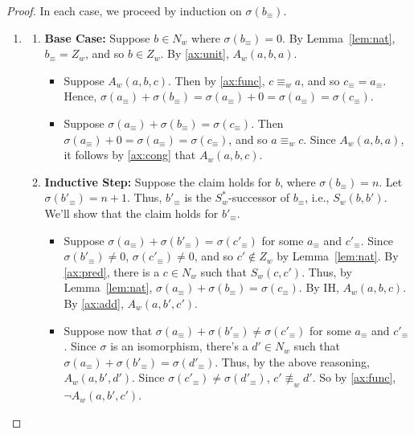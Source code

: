 \documentclass[12pt]{article}
\begin{document}
\begin{proof}
    In each case, we proceed by induction on $\sigma(b_\equiv)$.
    \begin{enumerate}
        \item 
        \begin{enumerate}[label=(\roman*)]
            \item \textbf{Base Case:} Suppose $b \in N_w$ where $\sigma(b_\equiv) = 0$. 
            By Lemma~\ref{lem:nat}, $b_\equiv = Z_w$, and so $b \in Z_w$. 
            By \ref{ax:unit}, $A_w(a,b,a)$. 
            \begin{itemize}
                \item[($\Rightarrow$)] Suppose $A_w(a,b,c)$. 
                Then by \ref{ax:func}, $c \equiv_w a$, and so $c_\equiv = a_\equiv$. 
                Hence, $\sigma(a_\equiv) + \sigma(b_\equiv) = \sigma(a_\equiv) + 0 = \sigma(a_\equiv) = \sigma(c_\equiv)$. 
                
                \item[($\Leftarrow$)] Suppose $\sigma(a_\equiv) + \sigma(b_\equiv) = \sigma(c_\equiv)$. 
                Then $\sigma(a_\equiv) + 0 = \sigma(a_\equiv) = \sigma(c_\equiv)$, and so $a \equiv_w c$. 
                Since $A_w(a,b,a)$, it follows by \ref{ax:cong} that $A_w(a,b,c)$. 
            \end{itemize}

            \item \textbf{Inductive Step:} Suppose the claim holds for $b$, where $\sigma(b_\equiv) = n$. 
            Let $\sigma(b'_\equiv) = n+1$. 
            Thus, $b'_\equiv$ is the $S_w^*$-successor of $b_\equiv$, i.e., $S_w(b,b')$. 
            We'll show that the claim holds for $b'_\equiv$. 
            \begin{itemize}
                \item[($\Leftarrow$)] Suppose $\sigma(a_\equiv) + \sigma(b'_\equiv) = \sigma(c'_\equiv)$ for some $a_\equiv$ and $c'_\equiv$. 
                Since $\sigma(b'_\equiv) \neq 0$, $\sigma(c'_\equiv) \neq 0$, and so $c' \notin Z_w$ by Lemma~\ref{lem:nat}. 
                By \ref{ax:pred}, there is a $c \in N_w$ such that $S_w(c,c')$. 
                Thus, by Lemma~\ref{lem:nat}, $\sigma(a_\equiv) + \sigma(b_\equiv) = \sigma(c_\equiv)$. 
                By IH, $A_w(a,b,c)$. 
                By \ref{ax:add}, $A_w(a,b',c')$. 
                
                \item[($\Rightarrow)$] Suppose now that $\sigma(a_\equiv) + \sigma(b'_\equiv) \neq \sigma(c'_\equiv)$ for some $a_\equiv$ and $c'_\equiv$. 
                Since $\sigma$ is an isomorphism, there's a $d' \in N_w$ such that $\sigma(a_\equiv) + \sigma(b'_\equiv) = \sigma(d'_\equiv)$. 
                Thus, by the above reasoning, $A_w(a,b',d')$. 
                Since $\sigma(c'_\equiv) \neq \sigma(d'_\equiv)$, $c' \not\equiv_w d'$. 
                So by \ref{ax:func}, $\neg A_w(a,b',c')$. 
            \end{itemize}
        \end{enumerate}
     

\end{enumerate}
\end{proof}
\end{document}
